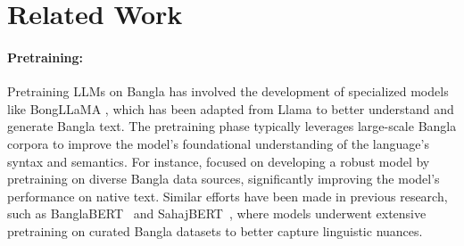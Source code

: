 \section{Related Work}
\label{sec:related_work}



\noindent
\paragraph{Pretraining:}
Pretraining LLMs on Bangla has involved the development of specialized models like BongLLaMA \cite{zehady2024bongllama}, which has been adapted from Llama to better understand and generate Bangla text. The pretraining phase typically leverages large-scale Bangla corpora to improve the model's foundational understanding of the language's syntax and semantics. For instance, \citet{zehady2024bongllama} focused on developing a robust model by pretraining on diverse Bangla data sources, significantly improving the model's performance on native text. Similar efforts have been made in previous research, such as BanglaBERT~\cite{bhattacharjee2022banglabert} and SahajBERT~\cite{diskin2021distributed}, where models underwent extensive pretraining on curated Bangla datasets to better capture linguistic nuances.


\noindent
